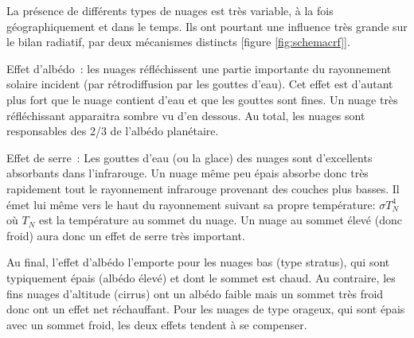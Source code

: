 \sk
La présence de différents types de nuages est très variable, à la fois géographiquement et dans le temps. Ils ont pourtant une influence très grande sur le bilan radiatif, par deux mécanismes distincts [figure \ref{fig:schemacrf}].
\begin{finger}
\item Effet d'albédo~: les nuages réfléchissent une partie importante du rayonnement solaire incident (par rétro\-diffusion par les gouttes d'eau). Cet effet est d'autant plus fort que le nuage contient d'eau et que les gouttes sont fines. Un nuage très réfléchissant apparaitra sombre vu d'en dessous. Au total, les nuages sont responsables des 2/3 de l'albédo planétaire.
\item Effet de serre~: Les gouttes d'eau (ou la glace) des nuages sont d'excellents absorbants dans l'infrarouge. Un nuage même peu épais absorbe donc très rapidement tout le rayonnement infrarouge provenant des couches plus basses. Il émet lui même vers le haut du rayonnement suivant sa propre température: $\sigma T_N^4$ où $T_N$ est la température au sommet du nuage. Un nuage au sommet élevé (donc froid) aura donc un effet de serre très important.
\end{finger}
Au final, l'effet d'albédo l'emporte pour les nuages bas (type stratus), qui sont typiquement épais (albédo élevé) et dont le sommet est chaud. Au contraire, les fins nuages d'altitude (cirrus) ont un albédo faible mais un sommet très froid donc ont un effet net réchauffant. Pour les nuages de type orageux, qui sont épais avec un sommet froid, les deux effets tendent à se compenser.

